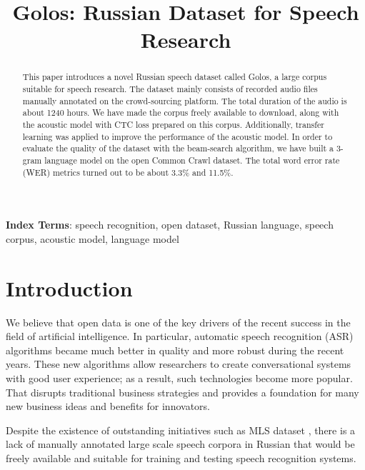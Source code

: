 \documentclass[a4paper]{article}
\title{Golos: Russian Dataset for Speech Research}
\begin{document}
\maketitle
% 
\begin{abstract}
 
This paper introduces a novel Russian speech dataset called Golos, a large corpus suitable for speech research. The dataset mainly consists of recorded audio files manually annotated on the crowd-sourcing platform. The total duration of the audio is about 1240 hours. We have made the corpus freely available to download, along with the acoustic model with CTC loss prepared on this corpus. Additionally, transfer learning was applied to improve the performance of the acoustic model. In order to evaluate the quality of the dataset with the beam-search algorithm, we have built a 3-gram language model on the open Common Crawl dataset. The total word error rate (WER) metrics turned out to be about 3.3\% and 11.5\%.

\end{abstract}
\noindent\textbf{Index Terms}: speech recognition, open dataset, Russian language, speech corpus, acoustic model, language model

\section{Introduction}
We believe that open data is one of the key drivers of the recent success in the field of artificial intelligence. In particular, automatic speech recognition (ASR) algorithms became much better in quality and more robust during the recent years. These new algorithms allow researchers to create conversational systems with good user experience; as a result, such technologies become more popular. That disrupts traditional business strategies and provides a foundation for many new business ideas and benefits for innovators. 
  
Despite the existence of outstanding initiatives such as MLS dataset \cite{pratap2020mls}, there is a lack of manually annotated large scale speech corpora in Russian that would be freely available and suitable for training and testing speech recognition systems.
 
\end{document}
